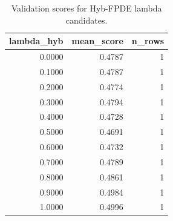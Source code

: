 \begin{table}[t]
\caption{Validation scores for Hyb-FPDE lambda candidates.}
\label{tab:lambda_distribution_computed}
\centering
\begin{tabular}{rrr}
\toprule
lambda\_hyb & mean\_score & n\_rows \\
\midrule
0.0000 & 0.4787 & 1 \\
0.1000 & 0.4787 & 1 \\
0.2000 & 0.4774 & 1 \\
0.3000 & 0.4794 & 1 \\
0.4000 & 0.4728 & 1 \\
0.5000 & 0.4691 & 1 \\
0.6000 & 0.4732 & 1 \\
0.7000 & 0.4789 & 1 \\
0.8000 & 0.4861 & 1 \\
0.9000 & 0.4984 & 1 \\
1.0000 & 0.4996 & 1 \\
\bottomrule
\end{tabular}

\end{table}
